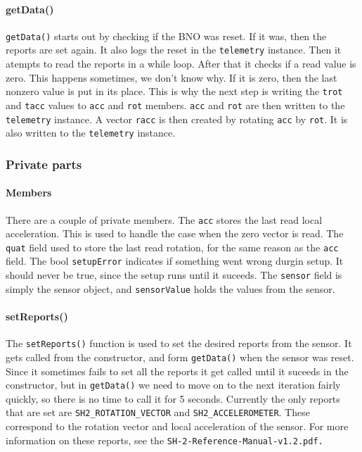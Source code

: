 \documentclass{article}
\begin{document}
\paragraph*{getData()}
\verb|getData()| starts out by checking if the BNO was reset. If it was, then the reports are set again. It also logs the reset in the \verb|telemetry| instance. Then it atempts to read the 
reports in a while loop. After that it checks if a read value is zero. This happens sometimes, we don't know why. If it is zero, then the last nonzero value is put in its place.
This is why the next step is writing the \verb|trot| and \verb|tacc| values to \verb|acc| and \verb|rot| members. \verb|acc| and \verb|rot| are then written to the \verb|telemetry| instance.
A vector \verb|racc| is then created by rotating \verb|acc| by \verb|rot|. It is also written to the \verb|telemetry| instance.

\subsubsection*{Private parts}
\paragraph*{Members}
There are a couple of private members. The \verb|acc| stores the last read local acceleration. This is used to handle the case when the zero vector is read. The \verb|quat| field 
used to store the last read rotation, for the same reason as the \verb|acc| field. The bool \verb|setupError| indicates if something went wrong durgin setup. It should never be true,
since the setup runs until it suceeds. The \verb|sensor| field is simply the sensor object, and \verb|sensorValue| holds the values from the sensor.

\paragraph*{setReports()}
The \verb|setReports()| function is used to set the desired reports from the sensor. It gets called from the constructor, and form \verb|getData()| when the sensor was reset. Since it
sometimes fails to set all the reports it get called until it suceeds in the constructor, but in \verb|getData()| we need to move on to the next iteration fairly quickly, so there is 
no time to call it for 5 seconds. Currently the only reports that are set are \verb|SH2_ROTATION_VECTOR| and \verb|SH2_ACCELEROMETER|. These correspond to the rotation vector and local
acceleration of the sensor. For more information on these reports, see the \verb|SH-2-Reference-Manual-v1.2.pdf.|
\end{document}
